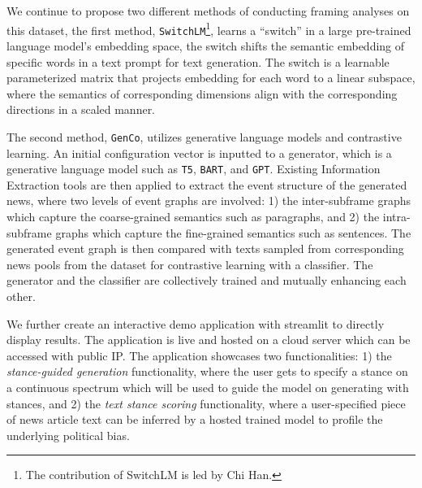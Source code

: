 We continue to propose two different methods of conducting framing analyses on this dataset, the first method, \texttt{SwitchLM}\footnote{The contribution of SwitchLM is led by Chi Han.}, learns a ``switch'' in a large pre-trained language model's embedding space, the switch shifts the semantic embedding of specific words in a text prompt for text generation. The switch is a learnable parameterized matrix that projects embedding for each word to a linear subspace, where the semantics of corresponding dimensions align with the corresponding directions in a scaled manner.

The second method, \texttt{GenCo}, utilizes generative language models and contrastive learning. An initial configuration vector is inputted to a generator, which is a generative language model such as \texttt{T5}, \texttt{BART}, and \texttt{GPT}. Existing Information Extraction tools are then applied to extract the event structure of the generated news, where two levels of event graphs are involved: 1) the inter-subframe graphs which capture the coarse-grained semantics such as paragraphs, and 2) the intra-subframe graphs which capture the fine-grained semantics such as sentences. The generated event graph is then compared with texts sampled from corresponding news pools from the dataset for contrastive learning with a classifier. The generator and the classifier are collectively trained and mutually enhancing each other.

We further create an interactive demo application with streamlit to directly display results. The application is live and hosted on a cloud server which can be accessed with public IP. The application showcases two functionalities: 1) the \textit{stance-guided generation} functionality, where the user gets to specify a stance on a continuous spectrum which will be used to guide the model on generating with stances, and 2) the \textit{text stance scoring} functionality, where a user-specified piece of news article text can be inferred by a hosted trained model to profile the underlying political bias.
